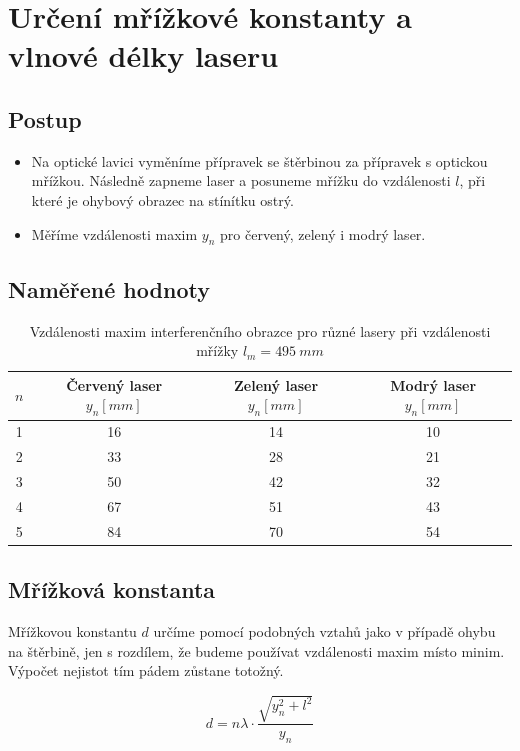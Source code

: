 \documentclass[a4paper,12pt]{article}
\begin{document}
\section{Určení mřížkové konstanty a vlnové délky laseru}
\subsection{Postup}
\begin{itemize}
    \item Na optické lavici vyměníme přípravek se štěrbinou za přípravek s optickou mřížkou. Následně zapneme laser a posuneme mřížku do vzdálenosti $l$, při které je ohybový obrazec na stínítku ostrý.
    \item Měříme vzdálenosti maxim $y_n$ pro červený, zelený i modrý laser.
\end{itemize}

\subsection{Naměřené hodnoty}

\begin{table}[H]
\centering
\renewcommand{\arraystretch}{1.5}
\begin{tabular}{|c|c|c|c|}
\hline
$n$ &
\textbf{Červený laser} $y_n\unit{[mm]}$&
\textbf{Zelený laser} $y_n\unit{[mm]}$&
\textbf{Modrý laser} $y_n\unit{[mm]}$ \\
\hline
1 & 16 & 14 & 10 \\
\hline
2 & 33 & 28 & 21 \\
\hline
3 & 50 & 42 & 32 \\
\hline
4 & 67 & 51 & 43 \\
\hline
5 & 84 & 70 & 54 \\
\hline
\end{tabular}
\caption{Vzdálenosti maxim interferenčního obrazce pro různé lasery při vzdálenosti mřížky $l_m=495\ \unit{mm}$}
\end{table}

\subsection{Mřížková konstanta}
Mřížkovou konstantu $d$ určíme pomocí podobných vztahů jako v případě ohybu na štěrbině, jen s rozdílem, že budeme používat vzdálenosti maxim místo minim. Výpočet nejistot tím pádem zůstane totožný.

$$
d = n\lambda \cdot \frac{\sqrt{y_n^2 + l^2}}{y_n}
$$
\end{document}
